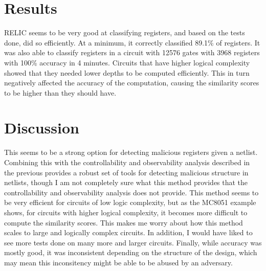\documentclass[12pt]{article}
\begin{document}
\section{Results}
RELIC seems to be very good at classifying registers, and based on the tests
done, did so efficiently. At a minimum, it correctly classified 89.1\% of
registers. It was also able to classify registers in a circuit with 12576 gates
with 3968 registers with 100\% accuracy in 4 minutes. Circuits that have higher
logical complexity showed that they needed lower depths to be computed
efficiently. This in turn negatively affected the accuracy of the computation,
causing the similarity scores to be higher than they should have.

\section{Discussion}

This seems to be a strong option for detecting malicious registers given a
netlist. Combining this with the controllability and observability analysis
described in the previous provides a robust set of tools for detecting
malicious structure in netlists, though I am not completely sure what this
method provides that the controllability and observability analysis does not
provide. This method seems to be very efficient for circuits of low logic
complexity, but as the MC8051 example shows, for circuits with higher logical
complexity, it becomes more difficult to compute the similarity scores. This
makes me worry about how this method scales to large and logically complex
circuits. In addition, I would have liked to see more tests done on many more
and larger circuits. Finally, while accuracy was mostly good, it was
inconsistent depending on the structure of the design, which may mean this
inconsitency might be able to be abused by an adversary. 
\end{document}

